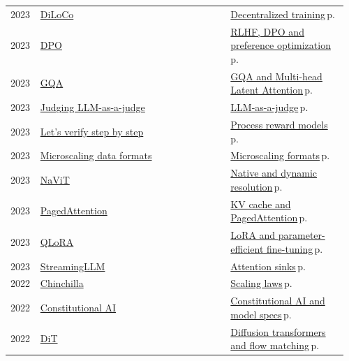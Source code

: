 \documentclass[10pt,a4paper,openany]{report}
\begin{document}
{\begin{longtable}{@{}p{0.07\linewidth}>{\raggedright}p{0.55\linewidth}>{\raggedright\arraybackslash}p{0.34\linewidth}@{}}
2023 & \href{https://arxiv.org/abs/2311.08105}{DiLoCo} & \hyperref[c:training-8]{Decentralized training}\,{\color{muted}\scriptsize p.\,\pageref{c:training-8}}\\
2023 & \href{https://arxiv.org/abs/2305.18290}{DPO} & \hyperref[c:reasoning-6]{RLHF, DPO and preference optimization}\,{\color{muted}\scriptsize p.\,\pageref{c:reasoning-6}}\\
2023 & \href{https://arxiv.org/abs/2305.13245}{GQA} & \hyperref[c:arch-1]{GQA and Multi-head Latent Attention}\,{\color{muted}\scriptsize p.\,\pageref{c:arch-1}}\\
2023 & \href{https://arxiv.org/abs/2306.05685}{Judging LLM-as-a-judge} & \hyperref[c:evals-2]{LLM-as-a-judge}\,{\color{muted}\scriptsize p.\,\pageref{c:evals-2}}\\
2023 & \href{https://arxiv.org/abs/2305.20050}{Let's verify step by step} & \hyperref[c:reasoning-8]{Process reward models}\,{\color{muted}\scriptsize p.\,\pageref{c:reasoning-8}}\\
2023 & \href{https://arxiv.org/abs/2310.10537}{Microscaling data formats} & \hyperref[c:quant-0]{Microscaling formats}\,{\color{muted}\scriptsize p.\,\pageref{c:quant-0}}\\
2023 & \href{https://arxiv.org/abs/2307.06304}{NaViT} & \hyperref[c:vlm-2]{Native and dynamic resolution}\,{\color{muted}\scriptsize p.\,\pageref{c:vlm-2}}\\
2023 & \href{https://arxiv.org/abs/2309.06180}{PagedAttention} & \hyperref[c:inference-1]{KV cache and PagedAttention}\,{\color{muted}\scriptsize p.\,\pageref{c:inference-1}}\\
2023 & \href{https://arxiv.org/abs/2305.14314}{QLoRA} & \hyperref[c:training-5]{LoRA and parameter-efficient fine-tuning}\,{\color{muted}\scriptsize p.\,\pageref{c:training-5}}\\
2023 & \href{https://arxiv.org/abs/2309.17453}{StreamingLLM} & \hyperref[c:arch-8]{Attention sinks}\,{\color{muted}\scriptsize p.\,\pageref{c:arch-8}}\\
2022 & \href{https://arxiv.org/abs/2203.15556}{Chinchilla} & \hyperref[c:training-1]{Scaling laws}\,{\color{muted}\scriptsize p.\,\pageref{c:training-1}}\\
2022 & \href{https://arxiv.org/abs/2212.08073}{Constitutional AI} & \hyperref[c:reasoning-7]{Constitutional AI and model specs}\,{\color{muted}\scriptsize p.\,\pageref{c:reasoning-7}}\\
2022 & \href{https://arxiv.org/abs/2212.09748}{DiT} & \hyperref[c:embodied-5]{Diffusion transformers and flow matching}\,{\color{muted}\scriptsize p.\,\pageref{c:embodied-5}}\\

\end{longtable}}
\end{document}
